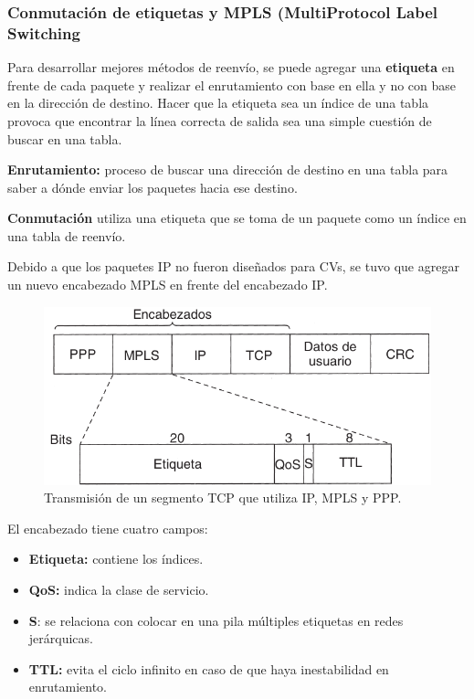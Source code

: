 \documentclass[10pt,a4paper]{article}
\begin{document}
\subsubsection{Conmutación de etiquetas y MPLS (MultiProtocol Label Switching}

Para desarrollar mejores métodos de reenvío, se puede agregar una \textbf{etiqueta} en frente de cada paquete y realizar el enrutamiento con base en ella y no con base en la dirección de destino. Hacer que la etiqueta sea un índice de una tabla provoca que encontrar la línea correcta de salida sea una simple cuestión de buscar en una tabla.

\begin{description}
\item \textbf{Enrutamiento:} proceso de buscar una dirección de destino en una tabla para saber a dónde enviar los paquetes hacia ese destino. 
\item \textbf{Conmutación} utiliza una etiqueta que se toma de un paquete como un índice en una tabla de reenvío.
\end{description}

Debido a que los paquetes IP no fueron diseñados para CVs, se tuvo que agregar un nuevo encabezado MPLS en frente del encabezado IP.

\begin{figure}
  \caption{Transmisión de un segmento TCP que utiliza IP, MPLS y PPP.}
  \label{fig:mpls_encabezado}
  \centering
  \hbox{\includegraphics[width=0.55\textwidth-\fboxrule-\fboxrule]{imgs/mpls_encabezado.png}}
\end{figure}

El encabezado tiene cuatro campos:
\begin{itemize}
\item \textbf{Etiqueta:} contiene los índices.
\item \textbf{QoS:} indica la clase de servicio.
\item \textbf{S}: se relaciona con colocar en una pila múltiples etiquetas en redes jerárquicas.
\item \textbf{TTL:} evita el ciclo infinito en caso de que haya inestabilidad en enrutamiento.
\end{itemize}
\end{document}
